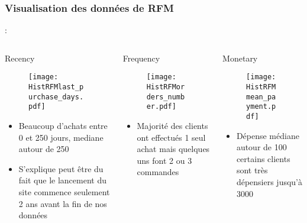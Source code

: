 \documentclass[8pt,aspectratio=169,hyperref={unicode=true}]{beamer}
\begin{document}
\subsubsection{Visualisation des données de RFM}
\begin{frame}{\insertsection: \insertsubsection}{\insertsubsubsection}
    \begin{columns}[t]
        \begin{column}{.33\textwidth}
            Recency
            \begin{figure}
                \texttt{[image: HistRFMlast\_purchase\_days.pdf]}
            \end{figure}
            \begin{itemize}
                \item Beaucoup d'achats entre 0 et 250 jours, mediane autour de 250
                \item S'explique peut être du fait que le lancement du site commence seulement 2 ans avant la fin de nos données 
            \end{itemize}
        \end{column}
        \begin{column}{.33\textwidth}
            Frequency
            \begin{figure}
                \texttt{[image: HistRFMorders\_number.pdf]}
            \end{figure}
            \begin{itemize}
                \item Majorité des clients ont effectués 1 seul achat mais quelques uns font 2 ou 3 commandes
            \end{itemize}
        \end{column}
        \begin{column}{.33\textwidth}
            Monetary
            \begin{figure}
                \texttt{[image: HistRFMmean\_payment.pdf]}
            \end{figure}
            \begin{itemize}
                \item Dépense médiane autour de 100  certains clients sont très dépensiers jusqu'à 3000
            \end{itemize}
        \end{column}
    \end{columns}
\end{frame}
\end{document}
